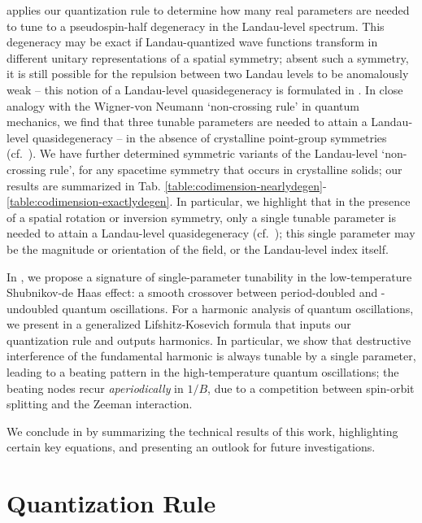\documentclass[aps, showpacs, twocolumn, notitlepage, superscriptaddress]{revtex4-1}
\begin{document}
{ applies} our quantization rule to determine how many real parameters are needed to tune to a {pseudo}spin-half degeneracy in the Landau-level spectrum. {This degeneracy may be exact if Landau-quantized wave functions transform in different unitary representations of a spatial symmetry; absent such a symmetry,} it is still possible for the repulsion between two Landau levels to be anomalously weak -- this notion of a Landau-level quasidegeneracy is formulated in . In close analogy with the Wigner-von Neumann `non-crossing rule' in quantum mechanics\cite{neumann2000behaviour}, we find that three tunable parameters are needed to attain a Landau-level quasidegeneracy -- in the absence of crystalline point-group symmetries (cf.\ ). 
We have further determined symmetric variants of the Landau-level ‘non-crossing rule’, for any spacetime symmetry that occurs in crystalline solids; our results are summarized in Tab.  \ref{table:codimension-nearlydegen}-\ref{table:codimension-exactlydegen}. In particular, we highlight that in the presence of a spatial rotation or inversion symmetry,  only a single tunable parameter is needed to attain a Landau-level quasidegeneracy (cf.\ ); this single parameter may be the magnitude or orientation of the field, or the Landau-level index itself.


In , we propose a signature of single-parameter tunability in the low-temperature Shubnikov-de Haas effect\cite{SdH}: a smooth crossover between period-doubled and -undoubled quantum oscillations. For a harmonic analysis of  quantum oscillations, we present in  a generalized Lifshitz-Kosevich formula that inputs our quantization rule and outputs harmonics. In particular, we show that destructive interference of the fundamental harmonic is always tunable by a single parameter, leading to a beating pattern in the high-temperature quantum oscillations; the beating nodes recur \textit{aperiodically} in $1/B$, due to a competition between spin-orbit splitting and the Zeeman interaction. 

We conclude in  by summarizing  the technical results of this work, highlighting certain key equations, and presenting an outlook for future investigations.    

\section{Quantization Rule\label{sec:qtznrules}}
\end{document}
